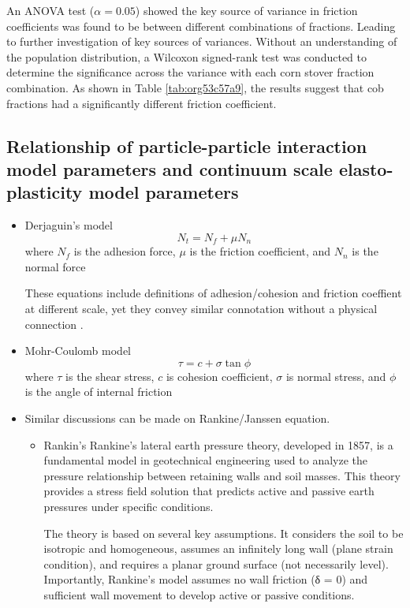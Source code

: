 \documentclass[xcolor=dvipsnames,10pt,hidelinks]{article}
\let\oldsubsection\subsection
\renewcommand{\subsection}{\clearpage\oldsubsection}
\begin{document}
An ANOVA test (\(\alpha = 0.05\)) showed the key source of variance in friction coefficients was found to be between different combinations of fractions. Leading to further investigation of key sources of variances.
Without an understanding of the population distribution, a Wilcoxon signed-rank test was conducted to determine the significance across the variance with each corn stover fraction combination.
As shown in Table \ref{tab:org53c57a9}, the results suggest that cob fractions had a significantly different friction coefficient.
\subsection{Relationship of particle-particle interaction model parameters and continuum scale elasto-plasticity model parameters}
\label{sec:org11ec0ac}
\begin{itemize}
\item Derjaguin's model
\label{sec:org1cce009}
\begin{equation}
  \label{eq:Derjaguin}
 N_t =  N_f + \mu N_n
\end{equation}
where \(N_f\) is the adhesion force, \(\mu\) is the friction coefficient, and \(N_n\) is the normal force

These equations include definitions of adhesion/cohesion and friction coeffient at different scale, yet they convey similar connotation without a physical connection  \parencite{reynolds_lvii_1885}.
\item Mohr-Coulomb model
\label{sec:org40473dc}
\begin{equation}
  \label{eq:mc}
  \tau = c + \sigma\tan\phi
\end{equation}
where \(\tau\) is the shear stress, \(c\) is cohesion coefficient, \(\sigma\) is normal stress, and \(\phi\) is the angle of internal friction
\item Similar discussions can be made on Rankine/Janssen equation.
\label{sec:org7526077}

\begin{itemize}
\item Rankin's
Rankine's lateral earth pressure theory, developed in 1857, is a fundamental model in geotechnical engineering used to analyze the pressure relationship between retaining walls and soil masses. This theory provides a stress field solution that predicts active and passive earth pressures under specific conditions.

The theory is based on several key assumptions. It considers the soil to be isotropic and homogeneous, assumes an infinitely long wall (plane strain condition), and requires a planar ground surface (not necessarily level). Importantly, Rankine's model assumes no wall friction (δ = 0) and sufficient wall movement to develop active or passive conditions.


\end{itemize}
\end{itemize}
\end{document}
